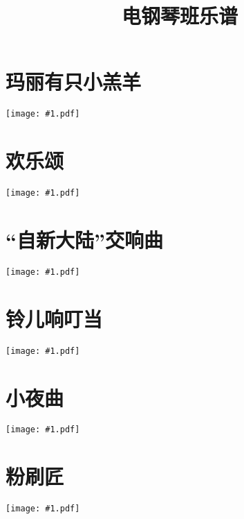 \documentclass[a4paper,12pt,fontset=none]{ctexart}
\title{\bfseries 电钢琴班乐谱}
\author{}
\date{}
\newcommand{\includescore}[1]{\begin{center}\texttt{[image: \#1.pdf]}\end{center}}
\begin{document}
\pagestyle{plain}

\maketitle

\thispagestyle{plain}

\section{玛丽有只小羔羊}
\includescore{mary-had-a-little-lamb}

\section{欢乐颂}
\includescore{ode-to-joy}

\section{“自新大陆”交响曲}
\includescore{from-the-new-world}

\section{铃儿响叮当}
\includescore{jingle-bells}

\section{小夜曲}
\includescore{serenade}

\section{粉刷匠}
\includescore{painter}
\end{document}
